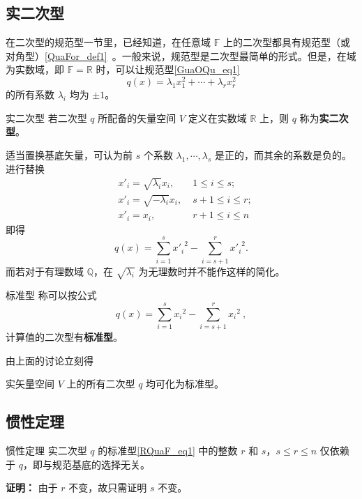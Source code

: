 

\subsection{实二次型}
在二次型的规范型一节里，已经知道，在任意域 $\mathbb F$ 上的二次型都具有规范型（或对角型）\autoref{QuaFor_def1}~。一般来说，规范型是二次型最简单的形式。但是，在域为实数域，即 $\mathbb F=\mathbb R$ 时，可以让规范型\autoref{GuaOQu_eq1}~
\begin{equation}
q({x})=\lambda_1 x_1^2+\cdots+\lambda_r x_r^2
\end{equation}
的所有系数 $\lambda_i$ 均为 $\pm 1$。
\begin{definition}{实二次型}
若二次型 $q$ 所配备的矢量空间 $V$ 定义在实数域 $\mathbb R$ 上，则 $q$ 称为\textbf{实二次型}。
\end{definition}
适当置换基底矢量，可认为前 $s$ 个系数 $\lambda_1,\cdots,\lambda_s$ 是正的，而其余的系数是负的。进行替换
\begin{equation}
\begin{aligned}
&x'_i=\sqrt{\lambda_i}x_i,\;&1\leq i\leq s;\\
&x'_i=\sqrt{-\lambda_i}x_i,\;&s+1\leq i\leq r;\\
&x'_i=x_i,\; &r+1\leq i\leq n
\end{aligned}
\end{equation}
 即得
 \begin{equation}
 q({x})=\sum_{i=1}^{s}{x'_i}^2-\sum_{i=s+1}^{r} {x'_{i}}^{2}.
 \end{equation}
 而若对于有理数域 $\mathbb Q$，在 $\sqrt{\lambda_i}$ 为无理数时并不能作这样的简化。
 
\begin{definition}{标准型}
称可以按公式
\begin{equation}\label{RQuaF_eq1}
q( x)=\sum_{i=1}^{s}{x_i}^2-\sum_{i=s+1}^{r} {x_{i}}^{2}~,
\end{equation}
计算值的二次型有\textbf{标准型}。
\end{definition}
由上面的讨论立刻得
\begin{theorem}{}\label{RQuaF_the1}
实矢量空间 $V$ 上的所有二次型 $q$ 均可化为标准型。
\end{theorem}
\subsection{惯性定理}
\begin{theorem}{惯性定理}
实二次型 $q$ 的标准型\autoref{RQuaF_eq1} 中的整数 $r$ 和 $s$，$s\leq r\leq n$ 仅依赖于 $q$，即与规范基底的选择无关。
\end{theorem}
\textbf{证明：} 由于 $r$ 不变，故只需证明 $s$ 不变。


